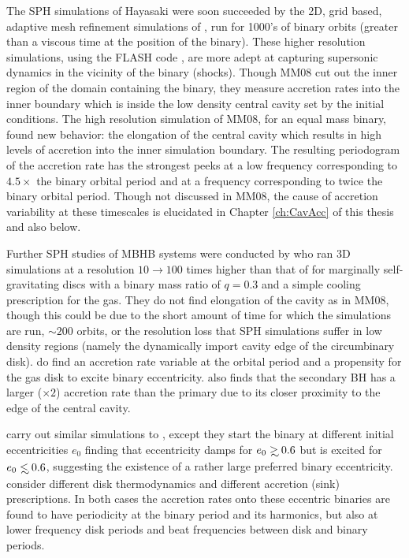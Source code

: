 The SPH simulations of Hayasaki were soon succeeded by the 2D, grid based,
adaptive mesh refinement simulations of \citep[][hereafter
MM08]{MacFadyen:2008},  run for 1000's of binary orbits (greater than a
viscous time at the position of the binary). These higher resolution
simulations, using the FLASH code \citep{Fryxell:2000}, are more adept at
capturing supersonic dynamics in the vicinity of the binary (shocks). Though
MM08 cut out the inner region of the domain containing the binary, they
measure accretion rates into the inner boundary which is inside the low
density central cavity set by the initial conditions. The high resolution
simulation of MM08, for an equal mass binary, found new behavior: the
elongation of the central cavity which results in high levels of accretion
into the inner simulation boundary. The resulting periodogram of the
accretion rate has the strongest peeks at a low frequency corresponding to
$4.5 \times$ the binary orbital period and at a frequency corresponding to
twice the binary orbital period. Though not discussed in MM08, the cause of
accretion variability at these timescales is elucidated in Chapter
\ref{ch:CavAcc} of this thesis and also \citep{ShiKrolik:2012} below.


Further SPH studies of MBHB systems were conducted by \citep{Cuadra:2009} who
ran 3D simulations at a resolution $10 \rightarrow 100$ times higher than that of
\cite{Hayasaki:2007} for marginally self-gravitating discs with a binary mass
ratio of $q=0.3$ and a simple cooling prescription for the gas. They do not
find elongation of the cavity as in MM08, though this could be due to the
short amount of time for which the simulations are run, $\sim 200$ orbits, or
the resolution loss that SPH simulations suffer in low density regions (namely
the dynamically import cavity edge of the circumbinary disk).
\citep{Cuadra:2009} do find an accretion rate variable at the orbital period
and a propensity for the gas disk to excite binary eccentricity.
\citep{Cuadra:2009} also finds that the secondary BH has a larger ($\times 2$)
accretion rate than the primary due to its closer proximity to the edge of
the central cavity.


\citep{Roedig:2012:Trqs} carry out similar simulations to \citep{Cuadra:2009}, except they start the binary at different initial eccentricities $e_0$ finding that eccentricity damps for $e_0 \gsim 0.6$ but is excited for $e_0 \lsim 0.6$, suggesting the existence of a rather large preferred binary eccentricity. \citep{Roedig:2011:eccevo} consider different disk thermodynamics and different accretion (sink) prescriptions. In both cases the accretion rates onto these eccentric binaries are found to have periodicity at the binary period and its harmonics, but also at lower frequency disk periods and beat frequencies between disk and binary periods.



